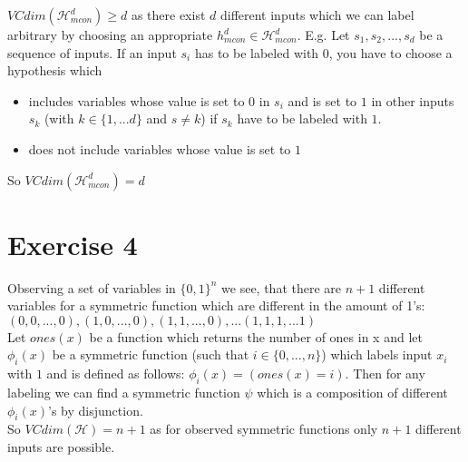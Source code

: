 \documentclass{article}
\begin{document}
$VCdim(\mathcal{H}_{mcon}^d) \geq d$ as
there exist $d$ different inputs which we can label arbitrary by choosing an appropriate $h_{mcon}^d \in \mathcal{H}_{mcon}^d$. E.g. Let $s_1, s_2, ..., s_{d}$ be a sequence of inputs. If an input $s_i$ has to be labeled with $0$, you have to choose a hypothesis which 
\begin{itemize}
\item includes variables whose value is set to $0$ in $s_i$ and is set to $1$ in other inputs $s_k$ (with $k \in \{1, ... d\}$ and $s\neq k$) if $s_k$ have to be labeled with $1$.
\item does not include variables whose value is set to $1$
\end{itemize}
So $VCdim(\mathcal{H}_{mcon}^d) = d$ 



\section*{Exercise 4}
Observing a set of variables in $\{0,1\}^n$ we see, that there are $n+1$ different variables for a symmetric function which are different in the amount of 1's: \\ ${(0,0,..., 0), (1,0,..., 0), (1,1,..., 0), ... (1,1,1, ... 1)}$ \\
Let $ones(x)$ be a function which returns the number of ones in x and let $\phi_i(x)$ be a symmetric function (such that $i\in\{0,..., n\}$) which labels input $x_i$ with $1$ and is defined as follows:
$\phi_i(x) = (ones(x) = i)$.
Then for any labeling we can find a symmetric function $\psi$ which is a composition of different  $\phi_i(x)$'s by disjunction. \\
So $VCdim(\mathcal{H}) = n+1$ as for observed symmetric functions only $n+1$ different inputs are possible.
\end{document}
